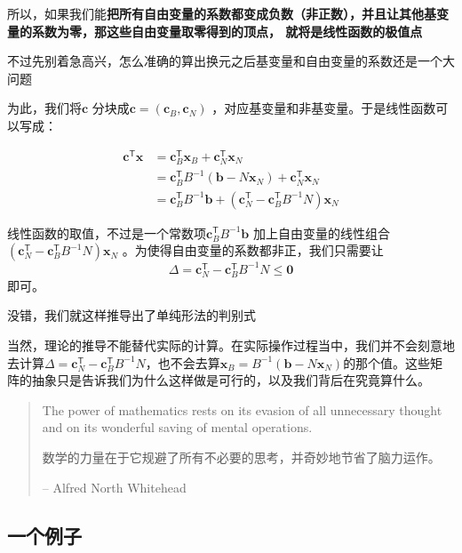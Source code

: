 \documentclass{../mathnotes-art}
\renewcommand{\c}{\mathbf{c}}
\renewcommand{\b}{\mathbf{b}}
\newcommand{\x}{\mathbf{x}}
\begin{document}
所以，如果我们能\textbf{把所有自由变量的系数都变成负数（非正数），并且让其他基变量的系数为零，那这些自由变量取零得到的顶点，
就将是线性函数的极值点}

不过先别着急高兴，怎么准确的算出换元之后基变量和自由变量的系数还是一个大问题

为此，我们将\(\c\) 分块成\(\c = (\c_{B}, \c_{N})\) ，对应基变量和非基变量。于是线性函数可以写成：

\begin{align*}
    \c^{\mathsf{T}} \x &= \c_{B}^{\mathsf{T}} \x_{B} +
    \c_{N}^{\mathsf{T}} \x_{N} \\
    &= \c_{B}^{\mathsf{T}} B^{-1}(\b - N\x_{N}) +
    \c_{N}^{\mathsf{T}} \x_{N} \\
    &= \c_{B}^{\mathsf{T}} B^{-1} \b + (\c_{N}^{\mathsf{T}} -
    \c_{B}^{\mathsf{T}} B^{-1} N) \x_{N}
\end{align*}

线性函数的取值，不过是一个常数项\(\c_{B}^{\mathsf{T}} B^{-1} \b\)
加上自由变量的线性组合\((\c_{N}^{\mathsf{T}} -
\c_{B}^{\mathsf{T}} B^{-1} N) \x_{N}\) 。为使得自由变量的系数都非正，我们只需要让\[
    \Delta = \c_{N}^{\mathsf{T}} - \c_{B}^{\mathsf{T}} B^{-1} N \leq \bm{0}
\] 即可。

没错，我们就这样推导出了单纯形法的判别式

当然，理论的推导不能替代实际的计算。在实际操作过程当中，我们并不会刻意地去计算\(\Delta = \c_{N}^{\mathsf{T}}
- \c_{B}^{\mathsf{T}} B^{-1} N\)，也不会去算\(\x_{B} = B^{-1}(\b -
N\x_{N})\)的那个值。这些矩阵的抽象只是告诉我们为什么这样做是可行的，以及我们背后在究竟算什么。

\begin{quote}
    The power of mathematics rests on its evasion of all unnecessary
    thought and on its wonderful saving of mental operations.

    数学的力量在于它规避了所有不必要的思考，并奇妙地节省了脑力运作。

    -- Alfred North Whitehead
\end{quote}

\subsection{一个例子}
\end{document}
